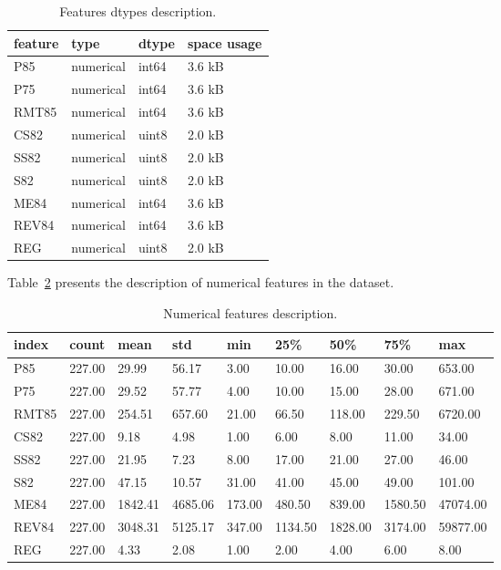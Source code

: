 \documentclass{article}%
\begin{document}
\begin{table}[H]%
\begin{center}%
\renewcommand{\arraystretch}{1.5}%
\begin{tabular}{l l l l}%
\hline%
\textbf{feature}&\textbf{type}&\textbf{dtype}&\textbf{space usage}\\%
\hline%
P85&numerical&int64&3.6 kB\\%
P75&numerical&int64&3.6 kB\\%
RMT85&numerical&int64&3.6 kB\\%
CS82&numerical&uint8&2.0 kB\\%
SS82&numerical&uint8&2.0 kB\\%
S82&numerical&uint8&2.0 kB\\%
ME84&numerical&int64&3.6 kB\\%
REV84&numerical&int64&3.6 kB\\%
REG&numerical&uint8&2.0 kB\\%
\hline%
\end{tabular}%
\end{center}%
\caption{Features dtypes description.}%
\label{tab:features_dtypes}%
\end{table}

%
Table~\ref{tab:numerical_features} %
presents the description of numerical features in the dataset.%


\begin{table}[H]%
\begin{center}%
\renewcommand{\arraystretch}{1.5}%
\begin{tabular}{l l l l l l l l l}%
\hline%
\textbf{index}&\textbf{count}&\textbf{mean}&\textbf{std}&\textbf{min}&\textbf{25\%}&\textbf{50\%}&\textbf{75\%}&\textbf{max}\\%
\hline%
P85&227.00&29.99&56.17&3.00&10.00&16.00&30.00&653.00\\%
P75&227.00&29.52&57.77&4.00&10.00&15.00&28.00&671.00\\%
RMT85&227.00&254.51&657.60&21.00&66.50&118.00&229.50&6720.00\\%
CS82&227.00&9.18&4.98&1.00&6.00&8.00&11.00&34.00\\%
SS82&227.00&21.95&7.23&8.00&17.00&21.00&27.00&46.00\\%
S82&227.00&47.15&10.57&31.00&41.00&45.00&49.00&101.00\\%
ME84&227.00&1842.41&4685.06&173.00&480.50&839.00&1580.50&47074.00\\%
REV84&227.00&3048.31&5125.17&347.00&1134.50&1828.00&3174.00&59877.00\\%
REG&227.00&4.33&2.08&1.00&2.00&4.00&6.00&8.00\\%
\hline%
\end{tabular}%
\end{center}%
\caption{Numerical features description.}%
\label{tab:numerical_features}%
\end{table}
\end{document}
